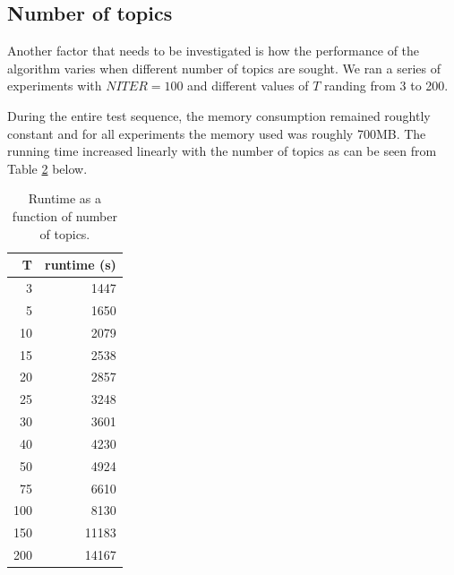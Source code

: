 \documentclass[11pt]{article}
\begin{document}
\begin{table}[t]
\begin{footnotesize}
\begin{raggedright}
\begin{tabular}{|p{4.7in} p{1.2in} |}
        \hline
        \end{tabular}
        \label{table:topics}
        \end{raggedright}
        \end{footnotesize}
        \end{table} 


    \subsection{Number of topics}

        Another factor that needs to be investigated is how the performance of the algorithm
        varies when different number of topics are sought.
        We ran a series of experiments with $NITER=100$ and different values of $T$ randing
        from 3 to 200.

        During the entire test sequence, the memory consumption remained roughtly constant
        and for all experiments the memory used was roughly 700MB.
        The running time increased linearly with the number of topics as can be seen from
        Table \ref{table:runtimeT} below.

        \begin{table}[htb]
        \centering
        \caption{Runtime as a function of number of topics.}
        \begin{tabular}{|r r|}
        \hline
        T   &   runtime (s) \\
        \hline
            3 &  1447 \\
            5 &  1650 \\
            10 &  2079 \\
            15 &  2538 \\
            20 &  2857 \\
            25 &  3248 \\
            30 &  3601 \\
            40 &  4230 \\
            50 &  4924 \\
            75 &  6610 \\
            100 &  8130 \\
            150 &  11183 \\
            200 &  14167 \\
        \hline
        \end{tabular}
        \label{table:runtimeT}
        \end{table} 
        
\end{document}
